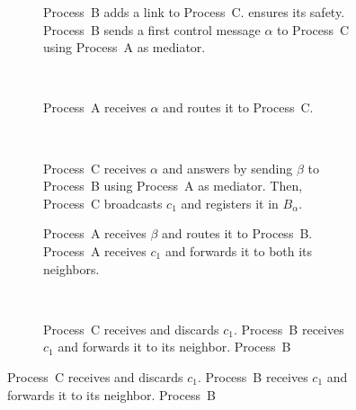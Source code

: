   


\begin{figure}
  \begin{center}
    \begin{subfigure}[t]{0.31\textwidth}
      \centering%
      \caption{\label{fig:solveA}Process~B adds a link to
        Process~C. \RPCBROADCAST ensures its safety. Process~B sends a first
        control message $\alpha$ to Process~C using Process~A as mediator.}
    \end{subfigure}
    ~
    \begin{subfigure}[t]{0.31\textwidth}
      \centering%
      \caption{\label{fig:solveB}Process~A receives $\alpha$ and routes it to
        Process~C.}
    \end{subfigure}
    ~
    \begin{subfigure}[t]{0.31\textwidth}
      \centering%
      \caption{\label{fig:solveC}Process~C receives $\alpha$ and answers by
        sending $\beta$ to Process~B using Process~A as mediator. Then,
        Process~C broadcasts $c_1$ and registers it in $B_\alpha$.}
    \end{subfigure}
    \begin{subfigure}[t]{0.48\textwidth}
      \centering%
      \caption{\label{fig:solveD}Process~A receives $\beta$ and routes it to
        Process~B.  Process~A receives $c_1$ and forwards it to both its
        neighbors.}
    \end{subfigure}
    ~
    \begin{subfigure}[t]{0.48\textwidth}
      \centering%
      \caption{\label{fig:solveE}Process~C receives and discards $c_1$.
        Process~B receives $c_1$ and forwards it to its neighbor.  Process~B
}
\end{subfigure}
\end{center}
\end{figure}
